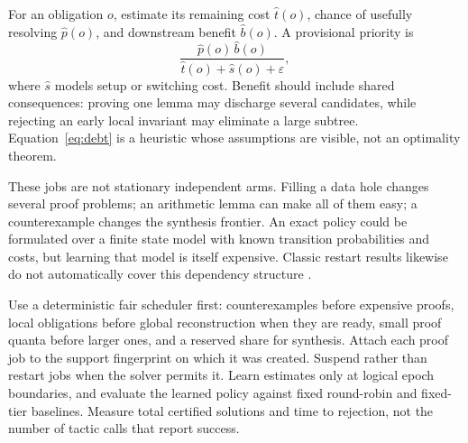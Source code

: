 
For an obligation $o$, estimate its remaining cost $\widehat t(o)$, chance of
usefully resolving $\widehat p(o)$, and downstream benefit $\widehat b(o)$.
A provisional priority is
\[
 \frac{\widehat p(o)\,\widehat b(o)}
      {\widehat t(o)+\widehat s(o)+\varepsilon},
 \tag{9}\label{eq:debt}
\]
where $\widehat s$ models setup or switching cost. Benefit should include
shared consequences: proving one lemma may discharge several candidates,
while rejecting an early local invariant may eliminate a large subtree.
Equation~\eqref{eq:debt} is a heuristic whose assumptions are visible, not an
optimality theorem.

These jobs are not stationary independent arms. Filling a data hole changes
several proof problems; an arithmetic lemma can make all of them easy; a
counterexample changes the synthesis frontier. An exact policy could be
formulated over a finite state model with known transition probabilities and
costs, but learning that model is itself expensive. Classic restart results
likewise do not automatically cover this dependency structure \cite{luby}.

Use a deterministic fair scheduler first: counterexamples before expensive
proofs, local obligations before global reconstruction when they are ready,
small proof quanta before larger ones, and a reserved share for synthesis.
Attach each proof job to the support fingerprint on which it was created.
Suspend rather than restart jobs when the solver permits it. Learn estimates
only at logical epoch boundaries, and evaluate the learned policy against
fixed round-robin and fixed-tier baselines. Measure total certified solutions
and time to rejection, not the number of tactic calls that report success.
